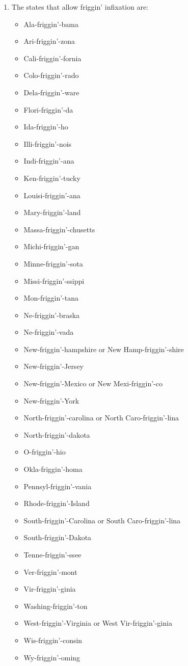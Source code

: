 \documentclass[12pt,letterpaper]{article}
\begin{document}
\begin{enumerate}
    \item
      The states that allow friggin' infixation are:
      \begin{itemize}
        \item Ala-friggin'-bama
        \item Ari-friggin'-zona
        \item Cali-friggin'-fornia
        \item Colo-friggin'-rado
        \item Dela-friggin'-ware
        \item Flori-friggin'-da
        \item Ida-friggin'-ho
        \item Illi-friggin'-nois
        \item Indi-friggin'-ana
        \item Ken-friggin'-tucky
        \item Louisi-friggin'-ana
        \item Mary-friggin'-land
        \item Massa-friggin'-chusetts
        \item Michi-friggin'-gan
        \item Minne-friggin'-sota
        \item Missi-friggin'-ssippi
        \item Mon-friggin'-tana
        \item Ne-friggin'-braska
        \item Ne-friggin'-vada
        \item New-friggin'-hampshire or New Hamp-friggin'-shire
        \item New-friggin'-Jersey
        \item New-friggin'-Mexico or New Mexi-friggin'-co
        \item New-friggin'-York
        \item North-friggin'-carolina or North Caro-friggin'-lina
        \item North-friggin'-dakota
        \item O-friggin'-hio
        \item Okla-friggin'-homa
        \item Pennsyl-friggin'-vania
        \item Rhode-friggin'-Island
        \item South-friggin'-Carolina or South Caro-friggin'-lina
        \item South-friggin'-Dakota
        \item Tenne-friggin'-ssee
        \item Ver-friggin'-mont
        \item Vir-friggin'-ginia
        \item Washing-friggin'-ton
        \item West-friggin'-Virginia or West Vir-friggin'-ginia
        \item Wis-friggin'-consin
        \item Wy-friggin'-oming
      \end{itemize}


\end{enumerate}
\end{document}
